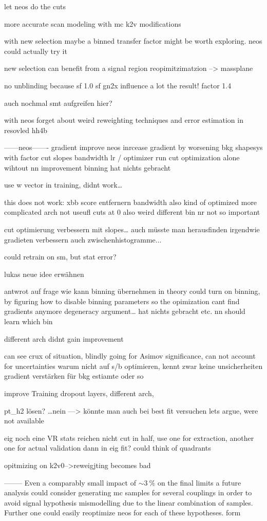let neos do the cuts 

more accurate scan modeling with mc k2v modifications 

with new selection maybe a binned transfer factor might be worth exploring.
neos could actually try it

new selection can benefit from a signal region reopimitzimatzion --> massplane


no unblinding because sf
1.0 sf gn2x influence a lot the result! factor 1.4 


auch nochmal smt aufgreifen hier?


with neos forget about weird reweighting techniques and error estimation in resovled hh4b


------neos-------
gradient improve neos
inrcease gradient by worsening bkg shapesys with factor
cut slopes
bandwidth 
lr / optimizer
run cut optimization alone wihtout nn improvement
binning hat nichts gebracht

use w vector in training, didnt work…

this does not work:
xbb score entfernern
bandwidth also kind of optimized
more complicated arch not useufl
cuts at 0 also weird 
different bin nr not so important

cut optimierung verbessern mit slopes… 
auch müsste man herausfinden 
irgendwie gradieten verbessern auch zwischenhistogramme...

could retrain on sm, but stat error?

lukas neue idee erwähnen



antwrot auf frage wie kann binning übernehmen 
in theory could turn on binning, by figuring how to disable binning parameters so the opimization cant find gradients anymore 
degeneracy argument… hat nichts gebracht etc. nn should learn which bin


different arch didnt gain improvement


can see crux of situation, blindly going for Asimov significance, can not account for uncertainties
warum nicht auf s/b optimieren, kennt zwar keine unsicherheiten
gradient verstärken für bkg estiamte oder so


improve Training
dropout layers, different arch, 


pt_h2 lösen? …nein —> könnte man auch bei best fit versuchen
lets argue, were not available

eig noch eine VR
stats reichen nicht 
cut in half, use one for extraction, another one for actual validation dann in eig fit?
could think of quadrants

opitmizing on k2v0-->reweigjting becomes bad


--------
Even a comparably small impact of $\sim\qty[]{3}{\percent}$ on the final limits a future analysis could consider generating \ac{mc} samples for several \ktwov couplings in order to avoid signal hypothesis mismodelling due to the linear combination of samples. Further one could easily reoptimize neos for each of these hypotheses. form
